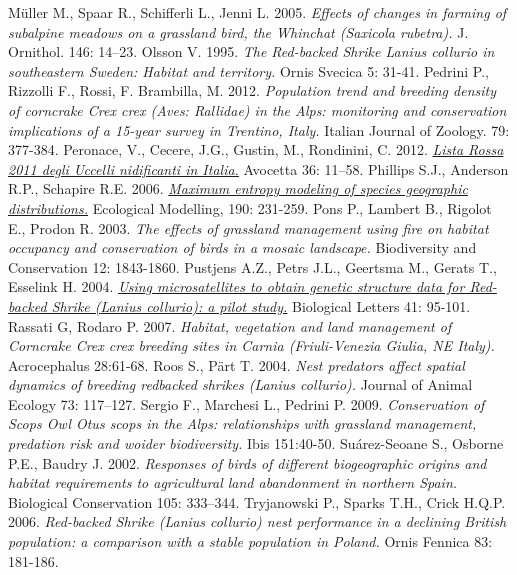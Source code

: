 \documentclass[10pt,twoside,openany,x11names,svgnames,italian,a5paper,dvipsnames,table]{memoir}
\begin{document}
\begin{thebibliography}{9}
Müller M., Spaar R., Schifferli L., Jenni L. 2005. \emph{Effects of changes in farming of subalpine meadows on a grassland bird, the Whinchat (\emph{Saxicola rubetra}).} J. Ornithol. 146: 14–23.
Olsson V. 1995. \emph{The Red-backed Shrike \emph{Lanius collurio} in southeastern Sweden: Habitat and territory.} Ornis Svecica 5: 31-41.
Pedrini P., Rizzolli F., Rossi, F. Brambilla, M. 2012. \emph{Population trend and breeding density of corncrake \emph{Crex crex} (\emph{Aves: Rallidae}) in the Alps: monitoring and conservation implications of a 15-year survey in Trentino, Italy.} Italian Journal of Zoology. 79: 377-384.
Peronace, V., Cecere, J.G., Gustin, M., Rondinini, C. 2012. \href{http://ciso-coi.it/wp-content/uploads/2012/10/redlist-2011.pdf}{\emph{Lista Rossa 2011 degli Uccelli nidificanti in Italia.}} Avocetta 36: 11–58.
Phillips S.J., Anderson R.P., Schapire R.E. 2006. \href{http://www.cs.princeton.edu/~schapire/papers/ecolmod.pdf}{\emph{Maximum entropy modeling of species geographic distributions.}} Ecological Modelling, 190: 231-259.
Pons P., Lambert B., Rigolot E., Prodon R. 2003. \emph{The effects of grassland management using fire on habitat occupancy and conservation of birds in a mosaic landscape.} Biodiversity and Conservation 12: 1843-1860.
Pustjens A.Z., Petrs J.L., Geertsma M., Gerats T., Esselink H. 2004. \href{http://www.pg.science.ru.nl/pubs/2004_biollett41.pdf}{\emph{Using microsatellites to obtain genetic structure data for Red-backed Shrike (\emph{Lanius collurio}): a pilot study.}} Biological Letters 41: 95-101.
Rassati G, Rodaro P. 2007. \emph{Habitat, vegetation and land management of Corncrake \emph{Crex crex} breeding sites in Carnia (Friuli-Venezia Giulia, NE Italy).} Acrocephalus 28:61-68.
Roos S., Pärt T. 2004. \emph{Nest predators affect spatial dynamics of breeding redbacked shrikes (\emph{Lanius collurio}).} Journal of Animal Ecology 73: 117–127.
Sergio F., Marchesi L., Pedrini P. 2009. \emph{Conservation of Scops Owl \emph{Otus scops} in the Alps: relationships with grassland management, predation risk and woider biodiversity.} Ibis 151:40-50.
Suárez-Seoane S., Osborne P.E., Baudry J. 2002. \emph{Responses of birds of different biogeographic origins and habitat requirements to agricultural land abandonment in northern Spain.} Biological Conservation 105: 333–344.
Tryjanowski P., Sparks T.H., Crick H.Q.P. 2006. \emph{Red-backed Shrike (\emph{Lanius collurio}) nest performance in a declining British population: a comparison with a stable population in Poland.} Ornis Fennica 83: 181-186.

\end{thebibliography}
\end{document}
